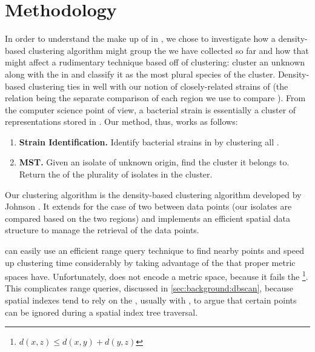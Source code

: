 \section{Methodology}\label{sec:methodology:clustering}

In order to understand the make up of \bslongs{} in \cplop{}, we chose to investigate how a density-based clustering algorithm might group the \isols{} we have collected so far and how that might affect a rudimentary \mst{} technique based off of clustering: cluster an unknown \isol{} along with the \isols{} in \cplop{} and classify it as the most plural species of the cluster.
Density-based clustering ties in well with our notion of closely-related strains of \ecoli{} (the relation being the separate \pearson{} comparison of each \itsshort{} region we use to compare \isols{}).
From the computer science point of view, a bacterial strain is essentially a cluster of \ecoli{} \isol{} representations stored in \cplop{}.
Our \mst{} method, thus, works as follows:
\begin{enumerate}
    \item \textbf{Strain Identification.} Identify bacterial strains in \cplop{} by clustering
    all \cplop{} \isols{}.
    \item \textbf{MST.} Given an isolate of unknown origin, find the cluster it belongs to.
    Return the \spec{} of the plurality of isolates in the cluster.
\end{enumerate}

Our clustering algorithm is the density-based clustering algorithm developed by Johnson \cite{johnson2015density}.
It extends \dbscan{} for the case of two \compfuncs{} between data points (our isolates are compared based on the two \itsshort{} regions) and implements an efficient spatial data structure to manage the retrieval of the data points.

\dbscan{} can easily use an efficient range query technique to find nearby points and speed up clustering time considerably by taking advantage of the \trieq{} that proper metric spaces have.
Unfortunately, \pearson{} does not encode a metric space, because it fails the \trieq{}\footnote{$d(x,z)\leq d(x,y) + d(y,z)$}. 
This complicates range queries, discussed in \autoref{sec:background:dbscan}, because spatial indexes tend to rely on the \trieq{}, usually with \euclid{}, to argue that certain points can be ignored during a spatial index tree traversal. 

